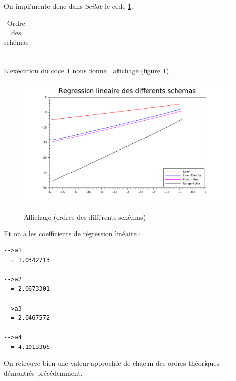 \documentclass[a4paper,10pt]{report}
\begin{document}
On implémente donc dans \textit{Scilab} le code \ref{code_ordre}.
\begin{table}[H]
\caption{Ordre des schémas}
\begin{tabular}{l}

\label{code_ordre}
\end{tabular}
\end{table}

\begin{table}[H]
\begin{tabular}{l}

\end{tabular}
\end{table}

L'exécution du code \ref{code_ordre} nous donne l'affichage (figure \ref{graph_ordre}).
\begin{figure}[H]
\centering
\caption{Affichage (ordres des différents schémas)}
\includegraphics[width=\textwidth]{ordre.pdf}
\label{graph_ordre}
\end{figure}

Et on a les coefficients de régression linéaire :
\begin{verbatim}
-->a1 
  = 1.0342713  
 
-->a2
  = 2.0673301  
 
-->a3
  = 2.0467572  
 
-->a4
  = 4.1013366 
\end{verbatim}
On retrouve bien une valeur approchée de chacun des ordres théoriques démontrés précédemment.

\newpage
\end{document}

